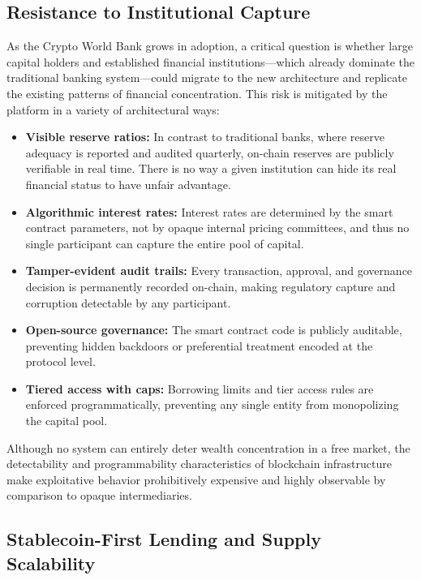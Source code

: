 \documentclass[12pt,a4paper]{report}
\begin{document}
\subsection{Resistance to Institutional Capture}

As the Crypto World Bank grows in adoption, a critical question is whether large capital holders and established financial institutions---which already dominate the traditional banking system---could migrate to the new architecture and replicate the existing patterns of financial concentration. This risk is mitigated by the platform in a variety of architectural ways:

\begin{itemize}[noitemsep]
\item \textbf{Visible reserve ratios:} In contrast to traditional banks, where reserve adequacy is reported and audited quarterly, on-chain reserves are publicly verifiable in real time. There is no way a given institution can hide its real financial status to have unfair advantage.
\item \textbf{Algorithmic interest rates:} Interest rates are determined by the smart contract parameters, not by opaque internal pricing committees, and thus no single participant can capture the entire pool of capital.
\item \textbf{Tamper-evident audit trails:} Every transaction, approval, and governance decision is permanently recorded on-chain, making regulatory capture and corruption detectable by any participant.
\item \textbf{Open-source governance:} The smart contract code is publicly auditable, preventing hidden backdoors or preferential treatment encoded at the protocol level.
\item \textbf{Tiered access with caps:} Borrowing limits and tier access rules are enforced programmatically, preventing any single entity from monopolizing the capital pool.
\end{itemize}

Although no system can entirely deter wealth concentration in a free market, the detectability and programmability characteristics of blockchain infrastructure make exploitative behavior prohibitively expensive and highly observable by comparison to opaque intermediaries.

\subsection{Stablecoin-First Lending and Supply Scalability}
\label{sec:stablecoin-first}
\end{document}
